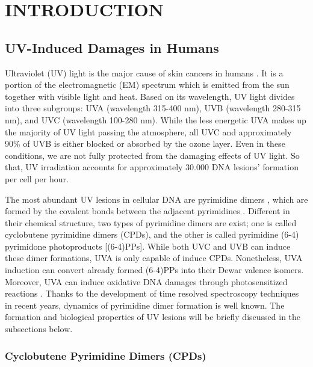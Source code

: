 \setlength{\parindent}{0pt}
\chapter{\bf INTRODUCTION}

\section{UV-Induced Damages in Humans}

Ultraviolet (UV) light is the major cause of skin cancers in humans \citep{kiefer2007effects}. It is a portion of the electromagnetic (EM) spectrum which is emitted from the sun together with visible light and heat. Based on its wavelength, UV light divides into three subgroups: UVA (wavelength 315-400 nm), UVB (wavelength 280-315 nm), and UVC (wavelength 100-280 nm). While the less energetic UVA makes up the majority of UV light passing the atmosphere, all UVC and approximately 90\% of UVB is either blocked or absorbed by the ozone layer. Even in these conditions, we are not fully protected from the damaging effects of UV light. So that, UV irradiation accounts for approximately 30.000 DNA lesions’ formation per cell per hour. 

The most abundant UV lesions in cellular DNA are pyrimidine dimers \citep{kielbassa1997wavelength}, which are formed by the covalent bonds between the adjacent pyrimidines \citep{whitmore2001effect}. Different in their chemical structure, two types of pyrimidine dimers are exist; one is called cyclobutene pyrimidine dimers (CPDs), and the other is called pyrimidine (6-4) pyrimidone photoproducts [(6-4)PPs]. While both UVC and UVB can induce these dimer formations, UVA is only capable of induce CPDs. Nonetheless, UVA induction can convert already formed (6-4)PPs into their Dewar valence isomers. Moreover, UVA can induce oxidative DNA damages through photosensitized reactions \citep{hu2017cartography}. Thanks to the development of time resolved spectroscopy techniques in recent years, dynamics of pyrimidine dimer formation is well known. The formation and biological properties of UV lesions will be briefly discussed in the subsections below.   

\subsection{Cyclobutene Pyrimidine Dimers (CPDs)} 

